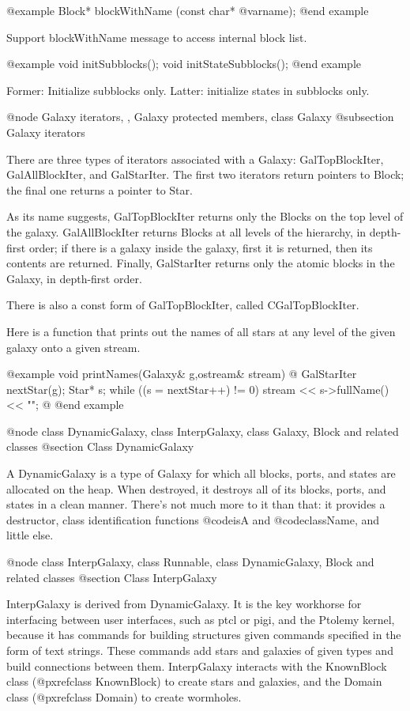 @example
Block* blockWithName (const char* @var{name});
@end example

Support blockWithName message to access internal block list.

@example
void initSubblocks();
void initStateSubblocks();
@end example

Former: Initialize subblocks only.  Latter: initialize states in
subblocks only.

@node Galaxy iterators,  , Galaxy protected members, class Galaxy
@subsection Galaxy iterators

There are three types of iterators associated with a Galaxy:
GalTopBlockIter, GalAllBlockIter, and GalStarIter.  The first
two iterators return pointers to Block; the final one returns
a pointer to Star.

As its name suggests, GalTopBlockIter returns only the Blocks
on the top level of the galaxy.  GalAllBlockIter returns
Blocks at all levels of the hierarchy, in depth-first order;
if there is a galaxy inside the galaxy, first it is returned,
then its contents are returned.  Finally, GalStarIter returns
only the atomic blocks in the Galaxy, in depth-first order.

There is also a const form of GalTopBlockIter, called CGalTopBlockIter.

Here is a function that prints out the names of all stars at any
level of the given galaxy onto a given stream.

@example
void printNames(Galaxy& g,ostream& stream) @{
    GalStarIter nextStar(g);
    Star* s;
    while ((s = nextStar++) != 0)
        stream << s->fullName() << "\n";
@}
@end example

@node class DynamicGalaxy, class InterpGalaxy, class Galaxy, Block and related classes
@section Class DynamicGalaxy

A DynamicGalaxy is a type of Galaxy for which all blocks, ports, and
states are allocated on the heap.  When destroyed, it destroys all of
its blocks, ports, and states in a clean manner.  There's not much
more to it than that: it provides a destructor, class identification
functions @code{isA} and @code{className}, and little else.

@node class InterpGalaxy, class Runnable, class DynamicGalaxy, Block and related classes
@section Class InterpGalaxy

InterpGalaxy is derived from DynamicGalaxy.  It is the key workhorse
for interfacing between user interfaces, such as ptcl or pigi, and
the Ptolemy kernel, because it has commands for building structures
given commands specified in the form of text strings.  These commands
add stars and galaxies of given types and build connections between
them.  InterpGalaxy interacts with the KnownBlock class
(@pxref{class KnownBlock}) to create stars and galaxies,
and the Domain class (@pxref{class Domain}) to create wormholes.

